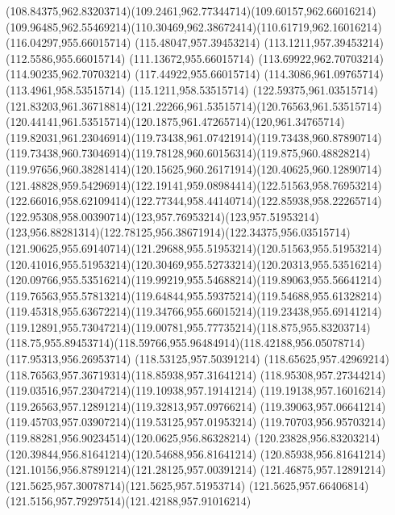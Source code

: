 {{	\curveto(108.84375,962.83203714)(109.2461,962.77344714)(109.60157,962.66016214)
	\curveto(109.96485,962.55469214)(110.30469,962.38672414)(110.61719,962.16016214)
	\closepath
	\moveto(116.04297,955.66015714)
	\lineto(115.48047,957.39453214)
	\lineto(113.1211,957.39453214)
	\lineto(112.5586,955.66015714)
	\lineto(111.13672,955.66015714)
	\lineto(113.69922,962.70703214)
	\lineto(114.90235,962.70703214)
	\lineto(117.44922,955.66015714)
	\closepath
	\moveto(114.3086,961.09765714)
	\lineto(113.4961,958.53515714)
	\lineto(115.1211,958.53515714)
	\closepath
	\moveto(122.59375,961.03515714)
	\curveto(121.83203,961.36718814)(121.22266,961.53515714)(120.76563,961.53515714)
	\curveto(120.44141,961.53515714)(120.1875,961.47265714)(120,961.34765714)
	\curveto(119.82031,961.23046914)(119.73438,961.07421914)(119.73438,960.87890714)
	\curveto(119.73438,960.73046914)(119.78128,960.60156314)(119.875,960.48828214)
	\curveto(119.97656,960.38281414)(120.15625,960.26171914)(120.40625,960.12890714)
	\curveto(121.48828,959.54296914)(122.19141,959.08984414)(122.51563,958.76953214)
	\curveto(122.66016,958.62109414)(122.77344,958.44140714)(122.85938,958.22265714)
	\curveto(122.95308,958.00390714)(123,957.76953214)(123,957.51953214)
	\curveto(123,956.88281314)(122.78125,956.38671914)(122.34375,956.03515714)
	\curveto(121.90625,955.69140714)(121.29688,955.51953214)(120.51563,955.51953214)
	\curveto(120.41016,955.51953214)(120.30469,955.52733214)(120.20313,955.53516214)
	\curveto(120.09766,955.53516214)(119.99219,955.54688214)(119.89063,955.56641214)
	\curveto(119.76563,955.57813214)(119.64844,955.59375214)(119.54688,955.61328214)
	\curveto(119.45318,955.63672214)(119.34766,955.66015214)(119.23438,955.69141214)
	\curveto(119.12891,955.73047214)(119.00781,955.77735214)(118.875,955.83203714)
	\curveto(118.75,955.89453714)(118.59766,955.96484914)(118.42188,956.05078714)
	\lineto(117.95313,956.26953714)
	\lineto(118.53125,957.50391214)
	\curveto(118.65625,957.42969214)(118.76563,957.36719314)(118.85938,957.31641214)
	\curveto(118.95308,957.27344214)(119.03516,957.23047214)(119.10938,957.19141214)
	\curveto(119.19138,957.16016214)(119.26563,957.12891214)(119.32813,957.09766214)
	\curveto(119.39063,957.06641214)(119.45703,957.03907214)(119.53125,957.01953214)
	\curveto(119.70703,956.95703214)(119.88281,956.90234514)(120.0625,956.86328214)
	\curveto(120.23828,956.83203214)(120.39844,956.81641214)(120.54688,956.81641214)
	\curveto(120.85938,956.81641214)(121.10156,956.87891214)(121.28125,957.00391214)
	\curveto(121.46875,957.12891214)(121.5625,957.30078714)(121.5625,957.51953714)
	\curveto(121.5625,957.66406814)(121.5156,957.79297514)(121.42188,957.91016214)
}}
